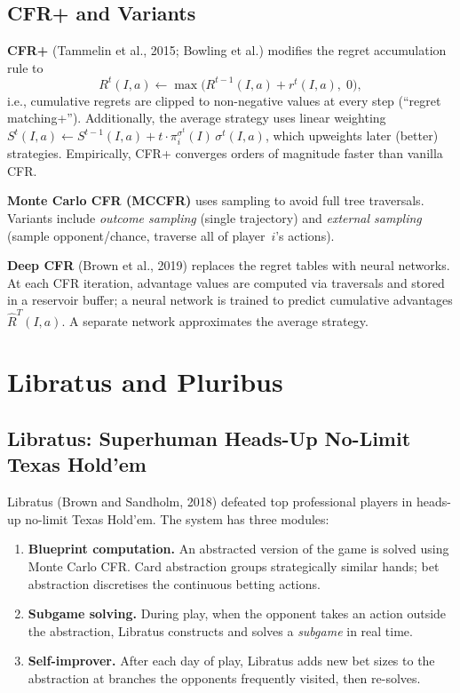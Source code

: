 \documentclass[11pt,a4paper]{article}
\theoremstyle{plain}
\theoremstyle{definition}
\begin{document}
\subsection{CFR+ and Variants}

\textbf{CFR+} (Tammelin et al., 2015; Bowling et al.) modifies the regret
accumulation rule to
\[
  R^t(I,a) \gets \max\bigl(R^{t-1}(I,a) + r^t(I,a),\; 0\bigr),
\]
i.e., cumulative regrets are clipped to non-negative values at every
step (``regret matching+'').  Additionally, the average strategy uses
linear weighting $S^t(I,a) \gets S^{t-1}(I,a) + t\cdot\pi_i^{\sigma^t}(I)\,\sigma^t(I,a)$, which upweights later (better) strategies.  Empirically, CFR+
converges orders of magnitude faster than vanilla CFR.

\textbf{Monte Carlo CFR (MCCFR)} uses sampling to avoid full tree
traversals.  Variants include \emph{outcome sampling} (single trajectory)
and \emph{external sampling} (sample opponent/chance, traverse all of
player~$i$'s actions).

\textbf{Deep CFR} (Brown et al., 2019) replaces the regret tables with
neural networks.  At each CFR iteration, advantage values are computed
via traversals and stored in a reservoir buffer; a neural network is
trained to predict cumulative advantages $\hat{R}^T(I,a)$.  A separate
network approximates the average strategy.

\section{Libratus and Pluribus}\label{sec:libratus}

\subsection{Libratus: Superhuman Heads-Up No-Limit Texas Hold'em}

Libratus (Brown and Sandholm, 2018) defeated top professional players in
heads-up no-limit Texas Hold'em.  The system has three modules:

\begin{enumerate}
  \item \textbf{Blueprint computation.}  An abstracted version of the game
    is solved using Monte Carlo CFR.  Card abstraction groups
    strategically similar hands; bet abstraction discretises the
    continuous betting actions.
  \item \textbf{Subgame solving.}  During play, when the opponent takes
    an action outside the abstraction, Libratus constructs and solves a
    \emph{subgame} in real time.
  \item \textbf{Self-improver.}  After each day of play, Libratus adds
    new bet sizes to the abstraction at branches the opponents
    frequently visited, then re-solves.
\end{enumerate}
\end{document}
